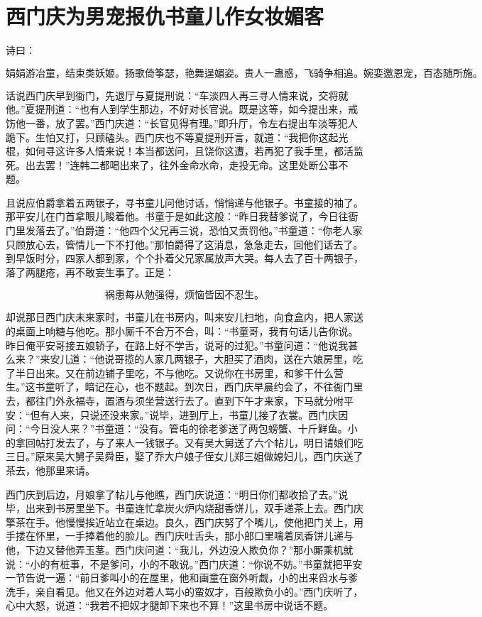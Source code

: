 

\chapter{西门庆为男宠报仇\KG 书童儿作女妆媚客}


诗曰：

\[
娟娟游冶童，结束类妖姬。扬歌倚筝瑟，艳舞逞媚姿。
贵人一蛊惑，飞骑争相追。婉娈邀恩宠，百态随所施。
\]

话说西门庆早到衙门，先退厅与夏提刑说：“车淡四人再三寻人情来说，交将就他。”夏提刑道：“也有人到学生那边，不好对长官说。既是这等，如今提出来，戒饬他一番，放了罢。”西门庆道：“长官见得有理。”即升厅，令左右提出车淡等犯人跪下。生怕又打，只顾磕头。西门庆也不等夏提刑开言，就道：“我把你这起光棍，如何寻这许多人情来说！本当都送问，且饶你这遭，若再犯了我手里，都活监死。出去罢！”连韩二都喝出来了，往外金命水命，走投无命。这里处断公事不题。

且说应伯爵拿着五两银子，寻书童儿问他讨话，悄悄递与他银子。书童接的袖了。那平安儿在门首拿眼儿睃着他。书童于是如此这般：“昨日我替爹说了，今日往衙门里发落去了。”伯爵道：“他四个父兄再三说，恐怕又责罚他。”书童道：“你老人家只顾放心去，管情儿一下不打他。”那怕爵得了这消息，急急走去，回他们话去了。到早饭时分，四家人都到家，个个扑着父兄家属放声大哭。每人去了百十两银子，落了两腿疮，再不敢妄生事了。正是：

\[
祸患每从勉强得，烦恼皆因不忍生。
\]

却说那日西门庆未来家时，书童儿在书房内，叫来安儿扫地，向食盒内，把人家送的桌面上响糖与他吃。那小厮千不合万不合，叫：“书童哥，我有句话儿告你说。昨日俺平安哥接五娘轿子，在路上好不学舌，说哥的过犯。”书童问道：“他说我甚么来？”来安儿道：“他说哥揽的人家几两银子，大胆买了酒肉，送在六娘房里，吃了半日出来。又在前边铺子里吃，不与他吃。又说你在书房里，和爹干什么营生。”这书童听了，暗记在心，也不题起。到次日，西门庆早晨约会了，不往衙门里去，都往门外永福寺，置酒与须坐营送行去了。直到下午才来家，下马就分咐平安：“但有人来，只说还没来家。”说毕，进到厅上，书童儿接了衣裳。西门庆因问：“今日没人来？”书童道：“没有。管屯的徐老爹送了两包螃蟹、十斤鲜鱼。小的拿回帖打发去了，与了来人一钱银子。又有吴大舅送了六个帖儿，明日请娘们吃三日。”原来吴大舅子吴舜臣，娶了乔大户娘子侄女儿郑三姐做媳妇儿，西门庆送了茶去，他那里来请。

西门庆到后边，月娘拿了帖儿与他瞧，西门庆说道：“明日你们都收拾了去。”说毕，出来到书房里坐下。书童连忙拿炭火炉内烧甜香饼儿，双手递茶上去。西门庆擎茶在手。他慢慢挨近站立在桌边。良久，西门庆努了个嘴儿，使他把门关上，用手搂在怀里，一手捧着他的脸儿。西门庆吐舌头，那小郎口里噙着凤香饼儿递与他，下边又替他弄玉茎。西门庆问道：“我儿，外边没人欺负你？”那小厮乘机就说：“小的有桩事，不是爹问，小的不敢说。”西门庆道：“你说不妨。”书童就把平安一节告说一遍：“前日爹叫小的在屋里，他和画童在窗外听觑，小的出来舀水与爹洗手，亲自看见。他又在外边对着人骂小的蛮奴才，百般欺负小的。”西门庆听了，心中大怒，说道：“我若不把奴才腿卸下来也不算！”这里书房中说话不题。

